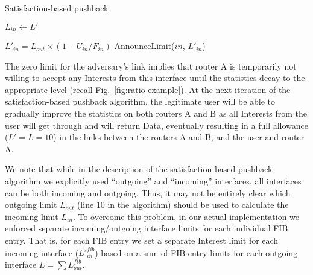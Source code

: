 
{ 
\begin{algorithm}[h]
\footnotesize
\caption{\small Satisfaction-based pushback}
\label{alg:dynamic limits}
\begin{algorithmic}[1]
\State{} 
\vspace{0.1cm}
  

\vspace{0.1cm}

\State{} 
    \State $L_{in} \leftarrow L'$
\EndFunction

\vspace{0.1cm}

 

        \State $L'_{in}= {L_{out}} \times (1 - U_{in}/F_{in})$
        \State AnnounceLimit($in$, $L'_{in}$)
   \EndFor

\EndFor
\EndFunction

\end{algorithmic}
\end{algorithm}


The zero limit for the adversary's link implies that  router A is temporarily not willing to accept any Interests from this interface until the statistics decay to the appropriate level (recall Fig.~\ref{fig:ratio example}).
At the next iteration of the satisfaction-based pushback algorithm, the legitimate user will be able to gradually improve the statistics on both routers A and B as all Interests from the user will get through and will return Data, eventually resulting in a full allowance ($L'=L=10$) in the links between the routers A and B, and the user and router A.

We note that while in the description of the satisfaction-based pushback algorithm we explicitly used ``outgoing'' and ``incoming'' interfaces,  all interfaces can be both incoming and outgoing.
Thus, it may not be entirely clear which outgoing limit $L_{out}$ (line 10 in the algorithm) should be used to calculate the incoming limit $L_{in}$.
To overcome this problem, in our actual implementation we enforced separate incoming/outgoing interface limits for each individual FIB entry.
That is, for each FIB entry we set a separate Interest limit for each incoming interface (${L'}_{in}^{fib}$) based on a sum of FIB entry limits for each outgoing interface $L=\sum{L_{out}^{fib}}$.


}
